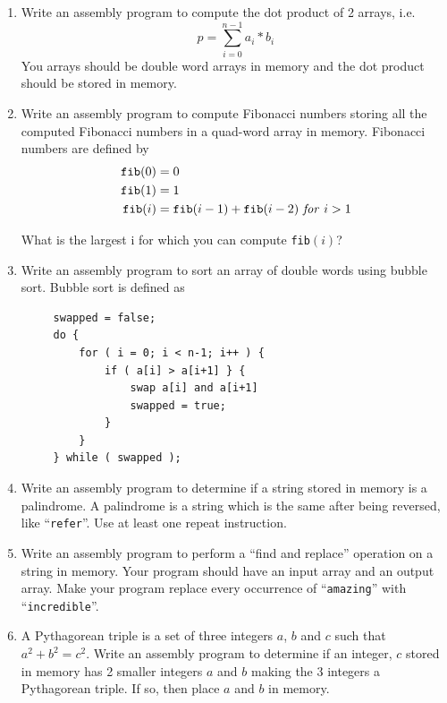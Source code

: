 \documentclass[11pt,b5paper]{book}
\begin{document}
\begin{enumerate}
 \item Write an assembly program to compute the dot product of 2 arrays, i.e.
$$p = \sum_{i=0}^{n-1}a_i * b_i$$
You arrays should be double word arrays in memory and the dot product should be stored in memory.

 \item Write an assembly program to compute Fibonacci numbers storing all the computed Fibonacci
 numbers in a quad-word array in memory.
 Fibonacci numbers are defined by
 \begin{align*}
     {\tt fib}(0) &= 0 \\
     {\tt fib}(1) &= 1 \\
     {\tt fib}(i) &= {\tt fib}(i-1) + {\tt fib}(i-2) {\it \ for\ } i > 1
 \end{align*}

 What is the largest i for which you can compute {\tt fib}$(i)$?
 
 \item Write an assembly program to sort an array of double words using bubble sort.
 Bubble sort is defined as
 \begin{verbatim}
     swapped = false;
     do {
         for ( i = 0; i < n-1; i++ ) {
             if ( a[i] > a[i+1] } {
                 swap a[i] and a[i+1]
                 swapped = true;
             }
         }
     } while ( swapped );
 \end{verbatim}
 
 \item Write an assembly program to determine if a string stored in memory is a
 palindrome.  A palindrome is a string which is the same after being reversed, like ``{\tt refer}''.
 Use at least one repeat instruction.
 
 \item Write an assembly program to perform a ``find and replace'' operation on a string in memory.
 Your program should have an input array and an output array.
 Make your program replace every occurrence of ``{\tt amazing}'' with ``{\tt incredible}''.
 
 \item A Pythagorean triple is a set of three integers $a$, $b$ and $c$ such that
 $a^2+b^2=c^2$.  Write an assembly program to determine if an integer, $c$ stored in memory has 2 smaller
 integers $a$ and $b$ making the 3 integers a Pythagorean triple.
 If so, then place $a$ and $b$ in memory.
 
\end{enumerate}
\end{document}
